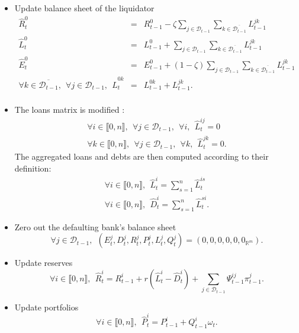 \documentclass{article}
\newcommand{\wh}{\widehat}
\begin{document}
\begin{itemize}

    \item Update balance sheet of the liquidator  
    \begin{eqnarray*}
    \wh R_t^0 &=& R_{t-1}^0 - \zeta \sum_{j \in \mathcal{D}_{t-1}} \sum_{k \in \overline{\mathcal{D}_{t-1}}} L^{jk}_{t-1}\\
    \wh L_t^0 &=& L_{t-1}^0 + \sum_{j \in \mathcal{D}_{t-1}} \sum_{k \in \overline{\mathcal{D}_{t-1}}} L^{jk}_{t-1}\\
    \wh E_t^0 &=& E_{t-1}^0 + (1 -\zeta) \sum_{j \in \mathcal{D}_{t-1}} \sum_{k \in \overline{\mathcal{D}_{t-1}}} L^{jk}_{t-1}\\
    \forall k \in \overline{\mathcal{D}_{t-1}},~~\forall j \in \mathcal{D}_{t-1},~~ \wh L_t^{0k} &=& L_{t-1}^{0k} + L_{t-1}^{jk}.\\
    \end{eqnarray*}
    
    \item The loans matrix is modified :
    \begin{eqnarray*}
    \forall i \in \llbracket 0, n \rrbracket,~~\forall j \in \mathcal{D}_{t-1},~~\forall i,~~ \wh L_t^{ij} = 0 \\
    \forall k \in \llbracket 0, n \rrbracket,~~\forall j \in \mathcal{D}_{t-1},~~\forall k,~~ \wh L_t^{jk} = 0.
    \end{eqnarray*}
    The aggregated loans and debts are then computed according to their definition:
    \begin{eqnarray*}
    \forall i \in \llbracket 0, n \rrbracket,~~ \wh L_t^i = \sum_{s=1}^n \wh L_t^{is} \\
    \forall i \in \llbracket 0, n \rrbracket,~~ \wh D_t^i = \sum_{s=1}^n \wh L_t^{si}.
    \end{eqnarray*}
    
    \item Zero out the defaulting bank's balance sheet
    $$\forall j \in \mathcal{D}_{t-1},~~(E_t^j, D_t^j, R_t^j, P_t^j, L_t^j, Q_t^j) = (0, 0, 0, 0, 0, 0_{\mathbb{R}^m}).$$
    
    \item Update reserves
    $$ \forall i \in \llbracket 0, n \rrbracket,~~ \widehat{R}_t^i = R_{t-1}^i + r (\wh L_t^i - \wh D_t^i) + \sum_{j \in \mathcal{D}_{t-1}} \Psi_{t-1}^{ij} \pi_{t-1}^j.$$
    
    \item Update portfolios
    $$\forall i \in \llbracket 0, n \rrbracket,~~ \widehat{P}_t^i = P_{t-1}^i + Q_{t-1}^i\omega_t.$$
    

\end{itemize}
\end{document}
